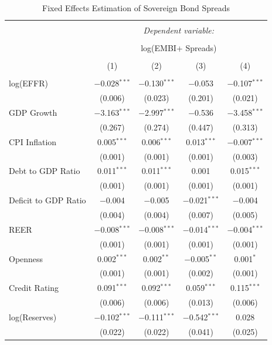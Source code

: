 \documentclass[12pt]{article}
\begin{document}
\begin{table}[!htbp] \centering 
  \caption{Fixed Effects Estimation of Sovereign Bond Spreads} 
  \label{tbl3} 
\scriptsize
\begin{tabular}{@{\extracolsep{5pt}}lcccc} 
\\[-1.8ex]\hline 
\hline \\[-1.8ex] 
 & \multicolumn{4}{c}{\textit{Dependent variable:}} \\ 
\cline{2-5} 
\\[-1.8ex] & \multicolumn{4}{c}{log(EMBI+ Spreads)} \\ 
\\[-1.8ex] & (1) & (2) & (3) & (4)\\ 
\hline \\[-1.8ex] 
 log(EFFR) & $-$0.028$^{***}$ & $-$0.130$^{***}$ & $-$0.053 & $-$0.107$^{***}$ \\ 
  & (0.006) & (0.023) & (0.201) & (0.021) \\ 
  GDP Growth & $-$3.163$^{***}$ & $-$2.997$^{***}$ & $-$0.536 & $-$3.458$^{***}$ \\ 
  & (0.267) & (0.274) & (0.447) & (0.313) \\ 
  CPI Inflation & 0.005$^{***}$ & 0.006$^{***}$ & 0.013$^{***}$ & $-$0.007$^{***}$ \\ 
  & (0.001) & (0.001) & (0.001) & (0.003) \\ 
  Debt to GDP Ratio & 0.011$^{***}$ & 0.011$^{***}$ & 0.001 & 0.015$^{***}$ \\ 
  & (0.001) & (0.001) & (0.001) & (0.001) \\ 
  Deficit to GDP Ratio & $-$0.004 & $-$0.005 & $-$0.021$^{***}$ & $-$0.004 \\ 
  & (0.004) & (0.004) & (0.007) & (0.005) \\ 
  REER & $-$0.008$^{***}$ & $-$0.008$^{***}$ & $-$0.014$^{***}$ & $-$0.004$^{***}$ \\ 
  & (0.001) & (0.001) & (0.001) & (0.001) \\ 
  Openness & 0.002$^{***}$ & 0.002$^{**}$ & $-$0.005$^{**}$ & 0.001$^{*}$ \\ 
  & (0.001) & (0.001) & (0.002) & (0.001) \\ 
  Credit Rating & 0.091$^{***}$ & 0.092$^{***}$ & 0.059$^{***}$ & 0.115$^{***}$ \\ 
  & (0.006) & (0.006) & (0.013) & (0.006) \\ 
  log(Reserves) & $-$0.102$^{***}$ & $-$0.111$^{***}$ & $-$0.542$^{***}$ & 0.028 \\ 
  & (0.022) & (0.022) & (0.041) & (0.025) \\ 

\end{tabular}
\end{table}
\end{document}
